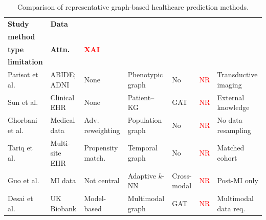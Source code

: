 \documentclass[pdflatex,sn-mathphys-num]{sn-jnl}%
\theoremstyle{thmstyleone}%
\theoremstyle{thmstyletwo}%
\theoremstyle{thmstylethree}%
\begin{document}
\begin{table}[!ht]
\centering
\caption{Comparison of representative graph-based healthcare prediction methods.}
\label{tab:related_graph_healthcare}

\begingroup

\fontsize{7.2}{8.2}\selectfont
\setlength{\tabcolsep}{1.8pt}
\renewcommand{\arraystretch}{1.06}

\begin{tabularx}{\textwidth}{@{}
>{\raggedright\arraybackslash\hsize=0.88\hsize}X
>{\raggedright\arraybackslash\hsize=0.66\hsize}X
>{\raggedright\arraybackslash\hsize=0.78\hsize}X
>{\raggedright\arraybackslash\hsize=0.98\hsize}X
>{\centering\arraybackslash\hsize=0.58\hsize}X
>{\raggedright\arraybackslash\hsize=0.85\hsize}X
>{\raggedright\arraybackslash\hsize=0.92\hsize}X
@{}}
\toprule

\textbf{Study} &
\textbf{Data} &
\shortstack{\textbf{Imbalance}\\\textbf{method}} &
\shortstack{\textbf{Graph}\\\textbf{type}} &
\textbf{Attn.} &
\textcolor{red}{\textbf{XAI}} &
\shortstack{\textbf{Main}\\\textbf{limitation}} \\
\midrule

Parisot et al.~\cite{parisot2018disease}
& ABIDE; ADNI
& None
& Phenotypic graph
& No
& \textcolor{red}{NR}
& Transductive imaging \\

Sun et al.~\cite{sun2021disease}
& Clinical EHR
& None
& Patient--KG
& GAT
& \textcolor{red}{NR}
& External knowledge \\

Ghorbani et al.~\cite{ghorbani2022ragcn}
& Medical data
& Adv. reweighting
& Population graph
& No
& \textcolor{red}{NR}
& No data resampling \\

Tariq et al.~\cite{tariq2024transfusion}
& Multi-site EHR
& Propensity match.
& Temporal graph
& No
& \textcolor{red}{NR}
& Matched cohort \\

Guo et al.~\cite{guo2026myocardial}
& MI data
& Not central
& Adaptive \(k\)-NN
& Cross-modal
& \textcolor{red}{NR}
& Post-MI only \\

Desai et al.~\cite{desai2026grasp}
& UK Biobank
& Model-based
& Multimodal graph
& GAT
& \textcolor{red}{NR}
& Multimodal data req. \\


\end{tabularx}
\end{table}
\end{document}
